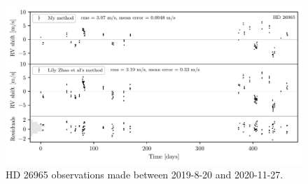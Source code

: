 \begin{figure}%
    \begin{wide}  
    \includegraphics[width=\textwidth]{figures/HD26965_barycentric_rv_vs_lily.pdf}
    \caption{HD 26965 observations made between 2019-8-20 and 2020-11-27.}
    \label{fig:HD26965_rvs}
\end{wide}
\end{figure}
